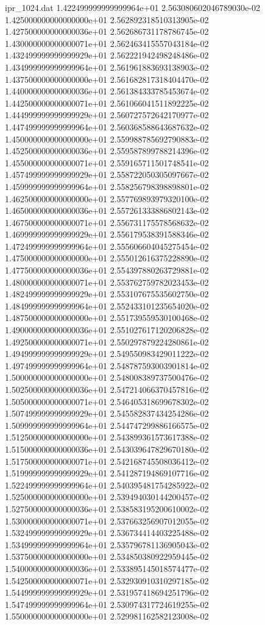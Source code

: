 \begin{filecontents}{ipr_1024.dat}
1.422499999999999964e+01 2.563080602046789030e-02
1.425000000000000000e+01 2.562892318510313905e-02
1.427500000000000036e+01 2.562686731178786745e-02
1.430000000000000071e+01 2.562463415557043184e-02
1.432499999999999929e+01 2.562221942498248486e-02
1.434999999999999964e+01 2.561961883693138903e-02
1.437500000000000000e+01 2.561682817318404470e-02
1.440000000000000036e+01 2.561384333785453674e-02
1.442500000000000071e+01 2.561066041511892225e-02
1.444999999999999929e+01 2.560727572642170977e-02
1.447499999999999964e+01 2.560368588643687632e-02
1.450000000000000000e+01 2.559988785692790883e-02
1.452500000000000036e+01 2.559587899788214396e-02
1.455000000000000071e+01 2.559165711501748541e-02
1.457499999999999929e+01 2.558722050305097667e-02
1.459999999999999964e+01 2.558256798398898801e-02
1.462500000000000000e+01 2.557769893979320100e-02
1.465000000000000036e+01 2.557261333886802143e-02
1.467500000000000071e+01 2.556731175578568632e-02
1.469999999999999929e+01 2.556179538391588346e-02
1.472499999999999964e+01 2.555606604045275454e-02
1.475000000000000000e+01 2.555012616375228890e-02
1.477500000000000036e+01 2.554397880263729881e-02
1.480000000000000071e+01 2.553762759782023453e-02
1.482499999999999929e+01 2.553107675535602750e-02
1.484999999999999964e+01 2.552433101235654020e-02
1.487500000000000000e+01 2.551739559530100468e-02
1.490000000000000036e+01 2.551027617120206828e-02
1.492500000000000071e+01 2.550297879224280861e-02
1.494999999999999929e+01 2.549550983429011222e-02
1.497499999999999964e+01 2.548787593003901814e-02
1.500000000000000000e+01 2.548008389737500476e-02
1.502500000000000036e+01 2.547214066370457816e-02
1.505000000000000071e+01 2.546405318699678302e-02
1.507499999999999929e+01 2.545582837434254286e-02
1.509999999999999964e+01 2.544747299886166575e-02
1.512500000000000000e+01 2.543899361573617388e-02
1.515000000000000036e+01 2.543039647829670180e-02
1.517500000000000071e+01 2.542168745508036412e-02
1.519999999999999929e+01 2.541287194869107716e-02
1.522499999999999964e+01 2.540395481754285922e-02
1.525000000000000000e+01 2.539494030144200457e-02
1.527500000000000036e+01 2.538583195200610002e-02
1.530000000000000071e+01 2.537663256907012055e-02
1.532499999999999929e+01 2.536734414403225488e-02
1.534999999999999964e+01 2.535796781136905043e-02
1.537500000000000000e+01 2.534850380922959445e-02
1.540000000000000036e+01 2.533895145018574477e-02
1.542500000000000071e+01 2.532930910310297185e-02
1.544999999999999929e+01 2.531957418694251796e-02
1.547499999999999964e+01 2.530974317724619255e-02
1.550000000000000000e+01 2.529981162582123008e-02

\end{filecontents}
